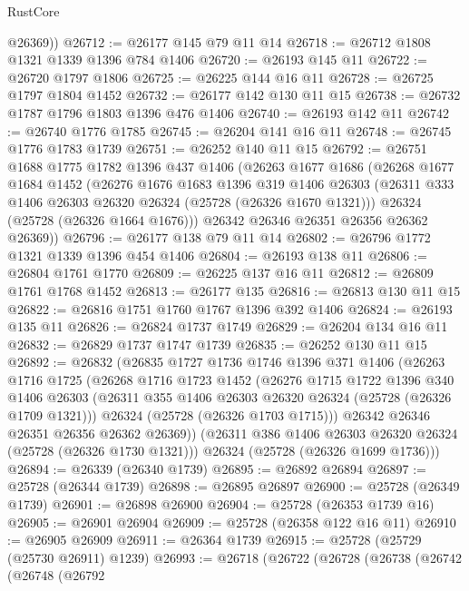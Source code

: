 \begin{lexlean}{RustCore}
\begin{coremodule}
        @26369))
@26712 := @26177 @145 @79 @11 @14
@26718 := @26712 @1808 @1321 @1339 @1396 @784 @1406
@26720 := @26193 @145 @11
@26722 := @26720 @1797 @1806
@26725 := @26225 @144 @16 @11
@26728 := @26725 @1797 @1804 @1452
@26732 := @26177 @142 @130 @11 @15
@26738 := @26732 @1787 @1796 @1803 @1396 @476 @1406
@26740 := @26193 @142 @11
@26742 := @26740 @1776 @1785
@26745 := @26204 @141 @16 @11
@26748 := @26745 @1776 @1783 @1739
@26751 := @26252 @140 @11 @15
@26792 := @26751
    @1688
    @1775
    @1782
    @1396
    @437
    @1406
    (@26263
      @1677
      @1686
      (@26268
        @1677
        @1684
        @1452
        (@26276
          @1676
          @1683
          @1396
          @319
          @1406
          @26303
          (@26311 @333 @1406 @26303 @26320 @26324 (@25728 (@26326 @1670 @1321)))
          @26324
          (@25728 (@26326 @1664 @1676)))
        @26342
        @26346
        @26351
        @26356
        @26362
        @26369))
@26796 := @26177 @138 @79 @11 @14
@26802 := @26796 @1772 @1321 @1339 @1396 @454 @1406
@26804 := @26193 @138 @11
@26806 := @26804 @1761 @1770
@26809 := @26225 @137 @16 @11
@26812 := @26809 @1761 @1768 @1452
@26813 := @26177 @135
@26816 := @26813 @130 @11 @15
@26822 := @26816 @1751 @1760 @1767 @1396 @392 @1406
@26824 := @26193 @135 @11
@26826 := @26824 @1737 @1749
@26829 := @26204 @134 @16 @11
@26832 := @26829 @1737 @1747 @1739
@26835 := @26252 @130 @11 @15
@26892 := @26832
    (@26835
      @1727
      @1736
      @1746
      @1396
      @371
      @1406
      (@26263
        @1716
        @1725
        (@26268
          @1716
          @1723
          @1452
          (@26276
            @1715
            @1722
            @1396
            @340
            @1406
            @26303
            (@26311 @355 @1406 @26303 @26320 @26324 (@25728 (@26326 @1709 @1321)))
            @26324
            (@25728 (@26326 @1703 @1715)))
          @26342
          @26346
          @26351
          @26356
          @26362
          @26369))
      (@26311 @386 @1406 @26303 @26320 @26324 (@25728 (@26326 @1730 @1321)))
      @26324
      (@25728 (@26326 @1699 @1736)))
@26894 := @26339 (@26340 @1739)
@26895 := @26892 @26894
@26897 := @25728 (@26344 @1739)
@26898 := @26895 @26897
@26900 := @25728 (@26349 @1739)
@26901 := @26898 @26900
@26904 := @25728 (@26353 @1739 @16)
@26905 := @26901 @26904
@26909 := @25728 (@26358 @122 @16 @11)
@26910 := @26905 @26909
@26911 := @26364 @1739
@26915 := @25728 (@25729 (@25730 @26911) @1239)
@26993 := @26718
    (@26722
      (@26728
        (@26738
          (@26742
            (@26748
              (@26792

\end{coremodule}
\end{lexlean}
